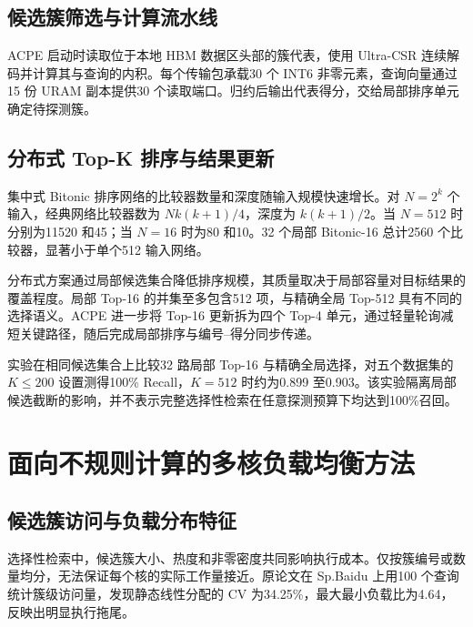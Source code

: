\subsection{候选簇筛选与计算流水线}
ACPE 启动时读取位于本地 HBM 数据区头部的簇代表，使用 Ultra-CSR 连续解码并计算其与查询的内积。每个传输包承载30 个 INT6 非零元素，查询向量通过15 份 URAM 副本提供30 个读取端口。归约后输出代表得分，交给局部排序单元确定待探测簇。


\subsection{分布式 Top-K 排序与结果更新}
集中式 Bitonic 排序网络的比较器数量和深度随输入规模快速增长。对 $N=2^k$ 个输入，经典网络比较器数为 $Nk(k+1)/4$，深度为 $k(k+1)/2$。当 $N=512$ 时分别为11520 和45；当 $N=16$ 时为80 和10。32 个局部 Bitonic-16 总计2560 个比较器，显著小于单个512 输入网络。

分布式方案通过局部候选集合降低排序规模，其质量取决于局部容量对目标结果的覆盖程度。局部 Top-16 的并集至多包含512 项，与精确全局 Top-512 具有不同的选择语义。ACPE 进一步将 Top-16 更新拆为四个 Top-4 单元，通过轻量轮询减短关键路径，随后完成局部排序与编号--得分同步传递。

实验在相同候选集合上比较32 路局部 Top-16 与精确全局选择，对五个数据集的 $K\leq200$ 设置测得100\% Recall，$K=512$ 时约为0.899 至0.903。该实验隔离局部候选截断的影响，并不表示完整选择性检索在任意探测预算下均达到100\%召回。

\section{面向不规则计算的多核负载均衡方法}
\subsection{候选簇访问与负载分布特征}
选择性检索中，候选簇大小、热度和非零密度共同影响执行成本。仅按簇编号或数量均分，无法保证每个核的实际工作量接近。原论文在 Sp.Baidu 上用100 个查询统计簇级访问量，发现静态线性分配的 CV 为34.25\%，最大最小负载比为4.64，反映出明显执行拖尾\cite{paretoes2026}。

